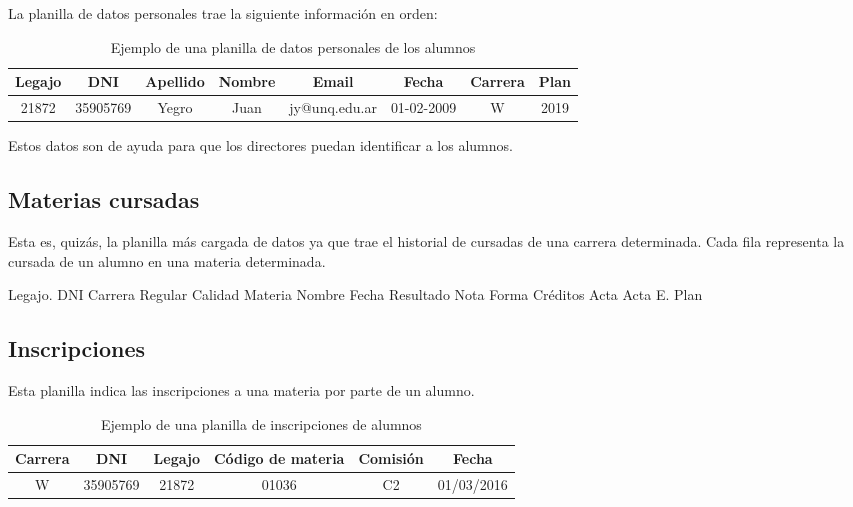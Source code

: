 La planilla de datos personales trae la siguiente información en orden: 

\begin{table}[]
    \centering
    \begin{tabular}{|c|c|c|c|c|c|c|c|}
    \hline
    Legajo & DNI & Apellido & Nombre & Email & Fecha & Carrera & Plan \\ \hline
    21872 & 35905769 & Yegro & Juan & jy@unq.edu.ar & 01-02-2009 & W & 2019 \\
    \hline
    \end{tabular}
    \caption{Ejemplo de una planilla de datos personales de los alumnos}
    \label{tab:tabla_datos}
\end{table}

Estos datos son de ayuda para que los directores puedan identificar a los alumnos.

\subsection[Materias cursadas]{Materias cursadas}

Esta es, quizás, la planilla más cargada de datos ya que trae el historial de cursadas de una carrera determinada. Cada fila representa la cursada de un alumno en una materia determinada.


\begin{outline}
    \2 Legajo.
    \2 DNI 
    \2 Carrera 
    \2 Regular 
    \2 Calidad 
    \2 Materia 
    \2 Nombre 
    \2 Fecha 
    \2 Resultado 
    \2 Nota 
    \2 Forma 
    \2 Créditos
    \2 Acta 
    \2 Acta E. 
    \2 Plan
\end{outline}

\subsection[Inscripciones]{Inscripciones}

Esta planilla indica las inscripciones a una materia por parte de un alumno.

\begin{table}[]
    \centering
    \makegapedcells
    \begin{tabular}{|c|c|c|c|c|c|}
    \hline
    Carrera & DNI & Legajo & Código de materia & Comisión & Fecha  \\\hline
    W & 35905769 & 21872 & 01036 & C2 & 01/03/2016  \\
    \hline
    \end{tabular}
    \caption{Ejemplo de una planilla de inscripciones de alumnos}
    \label{tab:tabla_datos}
\end{table}


